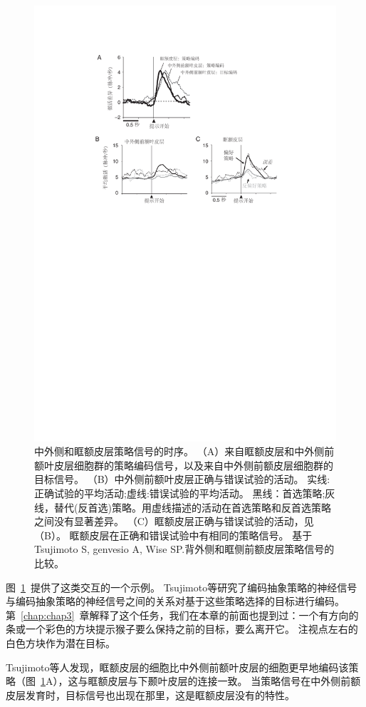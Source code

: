 \begin{figure}
	\centering
	\includegraphics[width=0.7\linewidth]{chap6/6_15}
	\caption{中外侧和眶额皮层策略信号的时序。
		（A）来自眶额皮层和中外侧前额叶皮层细胞群的策略编码信号，以及来自中外侧前额皮层细胞群的目标信号。
		（B）中外侧前额叶皮层正确与错误试验的活动。
		实线:正确试验的平均活动;虚线:错误试验的平均活动。
		黑线：首选策略;灰线，替代(反首选)策略。用虚线描述的活动在首选策略和反首选策略之间没有显著差异。
		（C）眶额皮层正确与错误试验的活动，见（B）。
		眶额皮层在正确和错误试验中有相同的策略信号。
		基于Tsujimoto S, genvesio A, Wise SP.背外侧和眶侧前额皮层策略信号的比较\cite{tsujimoto2011comparison}。}
	\label{fig:6_15}
\end{figure}


图~\ref{fig:6_15}~提供了这类交互的一个示例。
Tsujimoto等\cite{tsujimoto2011comparison}研究了编码抽象策略的神经信号与编码抽象策略的神经信号之间的关系对基于这些策略选择的目标进行编码。
第~\ref{chap:chap3}~章解释了这个任务，我们在本章的前面也提到过：一个有方向的条或一个彩色的方块提示猴子要么保持之前的目标，要么离开它。
注视点左右的白色方块作为潜在目标。


Tsujimoto等人发现，眶额皮层的细胞比中外侧前额叶皮层的细胞更早地编码该策略（图~\ref{fig:6_15}A），这与眶额皮层与下颞叶皮层的连接一致。
当策略信号在中外侧前额皮层发育时，目标信号也出现在那里，这是眶额皮层没有的特性。


